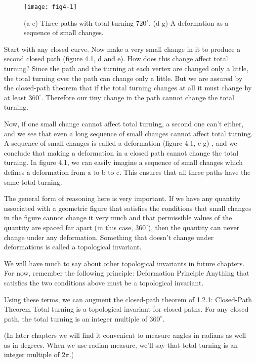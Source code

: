 \documentclass{book}
\begin{document}
\begin{figure}
\begin{center}
\texttt{[image: fig4-1]}
\caption{(a-c) Three paths with total turning $720^{\circ}$. (d-g) A deformation as a sequence of small changes.}
\end{center}
\end{figure}

Start with any closed curve. Now make a very small change in it to
produce a second closed path (figure 4.1, d and e). How does this change
affect total turning? Since the path and the turning at each vertex are
changed only a little, the total turning over the path can change only a
little. But we are assured by the closed-path theorem that if the total
turning changes at all it must change by at least $360^{\circ}$. Therefore our
tiny change in the path cannot change the total turning.

Now, if one small change cannot affect total turning, a second one
can't either, and we see that even a long sequence of small changes cannot affect total turning. A sequence of small changes is called a deformation (figure 4.1, e-g) , and we conclude that making a deformation
in a closed path cannot change the total turning. In figure 4.1, we can
easily imagine a sequence of small changes which defines a deformation
from a to b to c. This ensures that all three paths have the same total
turning.

The general form of reasoning here is very important. If we have any
quantity associated with a geometric figure that satisfies the conditions
that small changes in the figure cannot change it very much and that
permissible values of the quantity are spaced far apart (in this case, $360^{\circ}$),
then the quantity can never change under any deformation. Something
that doesn't change under deformations is called a topological invariant.

We will have much to say about other topological invariants in future
chapters. For now, remember the following principle:
Deformation Principle Anything that satisfies the two conditions above
must be a topological invariant.

Using these terms, we can augment the closed-path theorem of 1.2.1:
Closed-Path Theorem Total turning is a topological invariant for closed
paths. For any closed path, the total turning is an integer multiple of
$360^{\circ}$.

(In later chapters we will find it convenient to measure angles in radians
as well as in degrees. When we use radian measure, we'll say that total
turning is an integer multiple of $2\pi$.)
\end{document}
